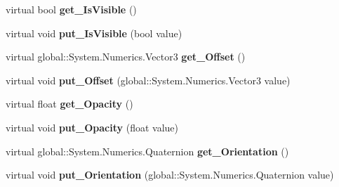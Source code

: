 \begin{DoxyCompactItemize}
\mbox{\label{class_windows_1_1_u_i_1_1_composition_1_1_visual_a3a7d203bd59ea8d7b4bc1978ab0fa1f9}} 
virtual bool {\bfseries get\+\_\+\+Is\+Visible} ()
\item 
\mbox{\label{class_windows_1_1_u_i_1_1_composition_1_1_visual_a81c567ec2b046085736b6354b159e7cd}} 
virtual void {\bfseries put\+\_\+\+Is\+Visible} (bool value)
\item 
\mbox{\label{class_windows_1_1_u_i_1_1_composition_1_1_visual_a905246c15eda186bee3efd6359a4ad4b}} 
virtual global\+::\+System.\+Numerics.\+Vector3 {\bfseries get\+\_\+\+Offset} ()
\item 
\mbox{\label{class_windows_1_1_u_i_1_1_composition_1_1_visual_a5ae1120de010788273be8a5ba125758b}} 
virtual void {\bfseries put\+\_\+\+Offset} (global\+::\+System.\+Numerics.\+Vector3 value)
\item 
\mbox{\label{class_windows_1_1_u_i_1_1_composition_1_1_visual_aefe015d14edbd0b01c59658d842ee6b6}} 
virtual float {\bfseries get\+\_\+\+Opacity} ()
\item 
\mbox{\label{class_windows_1_1_u_i_1_1_composition_1_1_visual_ac9c346d6488aba1731166730bd1abb6c}} 
virtual void {\bfseries put\+\_\+\+Opacity} (float value)
\item 
\mbox{\label{class_windows_1_1_u_i_1_1_composition_1_1_visual_a3cd98e040ae25a3b0e41adff6ce17cde}} 
virtual global\+::\+System.\+Numerics.\+Quaternion {\bfseries get\+\_\+\+Orientation} ()
\item 
\mbox{\label{class_windows_1_1_u_i_1_1_composition_1_1_visual_ab875fd373be5e98cf555fe044dfb879b}} 
virtual void {\bfseries put\+\_\+\+Orientation} (global\+::\+System.\+Numerics.\+Quaternion value)
\item 
\mbox{\label{class_windows_1_1_u_i_1_1_composition_1_1_visual_a26c62464881951a01cbced9fe2d055cf}} 

\end{DoxyCompactItemize}
